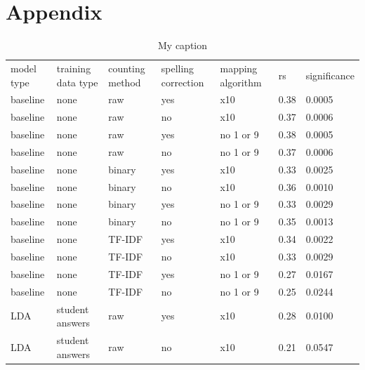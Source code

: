 \documentclass[a4paper,10pt,twoside]{article}
\begin{document}
\section{Appendix}
\begin{table}[]
	\centering
	\caption{My caption}
	\label{my-label}
	\begin{tabular}{lllllll}
		model type & training data type & counting method & spelling correction & mapping algorithm & rs   & significance \\
		baseline   & none               & raw             & yes                 & x10               & 0.38 & 0.0005       \\
		baseline   & none               & raw             & no                  & x10               & 0.37 & 0.0006       \\
		baseline   & none               & raw             & yes                 & no 1 or 9         & 0.38 & 0.0005       \\
		baseline   & none               & raw             & no                  & no 1 or 9         & 0.37 & 0.0006       \\
		baseline   & none               & binary          & yes                 & x10               & 0.33 & 0.0025       \\
		baseline   & none               & binary          & no                  & x10               & 0.36 & 0.0010       \\
		baseline   & none               & binary          & yes                 & no 1 or 9         & 0.33 & 0.0029       \\
		baseline   & none               & binary          & no                  & no 1 or 9         & 0.35 & 0.0013       \\
		baseline   & none               & TF-IDF          & yes                 & x10               & 0.34 & 0.0022       \\
		baseline   & none               & TF-IDF          & no                  & x10               & 0.33 & 0.0029       \\
		baseline   & none               & TF-IDF          & yes                 & no 1 or 9         & 0.27 & 0.0167       \\
		baseline   & none               & TF-IDF          & no                  & no 1 or 9         & 0.25 & 0.0244       \\
		LDA        & student answers    & raw             & yes                 & x10               & 0.28 & 0.0100       \\
		LDA        & student answers    & raw             & no                  & x10               & 0.21 & 0.0547       \\

\end{tabular}
\end{table}
\end{document}
